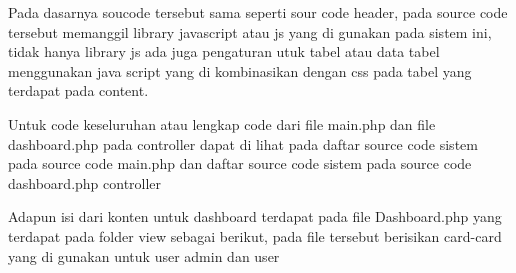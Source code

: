 	Pada dasarnya soucode tersebut sama seperti sour code header, pada source code tersebut memanggil library javascript atau js yang di gunakan pada sistem ini, tidak hanya library js ada juga pengaturan utuk tabel atau data tabel menggunakan java script yang di kombinasikan dengan css pada tabel yang terdapat pada content.\par
	Untuk code keseluruhan atau lengkap code dari file main.php dan file dashboard.php pada controller dapat di lihat pada daftar source code sistem pada  source code main.php dan daftar source code sistem pada  source code dashboard.php controller\par
Adapun isi dari konten untuk dashboard terdapat pada file Dashboard.php yang terdapat pada folder view sebagai berikut,  pada file tersebut berisikan card-card yang di gunakan untuk user admin dan user\par

